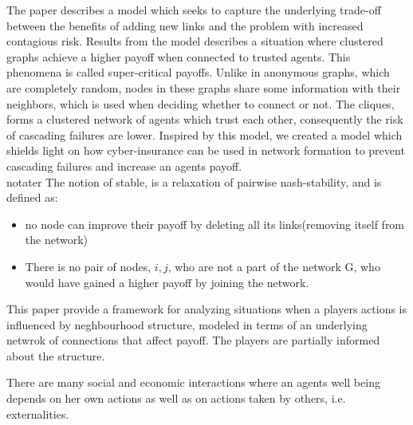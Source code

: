 The paper \cite{contagion} describes a model which seeks to capture the underlying trade-off between the benefits of adding new links and the problem with increased contagious risk. Results from the model describes a situation where clustered graphs achieve a higher payoff when connected to trusted agents. This phenomena is called super-critical payoffs. Unlike in anonymous graphs, which are completely random, nodes in these graphs share some information with their neighbors, which is used when deciding whether to connect or not. The cliques, forms a clustered network of agents which trust each other, consequently the risk of cascading failures are lower.
Inspired by this model, we created a model which shields light on how cyber-insurance can be used in network formation to prevent cascading failures and increase an agents payoff.  
\\notater
The notion of stable, is a relaxation of pairwise nash-stability, and is defined as:
\begin{itemize}
\item no node can improve their payoff by deleting all its links(removing itself from the network)
\item There is no pair of nodes, $i,j$, who are not a part of the network G, who would have gained a higher payoff by joining the network.
\end{itemize}

This paper\cite{networkgames}  provide a framework for analyzing situations when a players actions is influenced by neghbourhood structure, modeled in terms of an underlying netwrok of connections that affect payoff.
The players are partially informed about the structure. 

There are many social and economic interactions where an agents well being depends on her own actions as well as on actions taken by others, i.e. externalities. 


